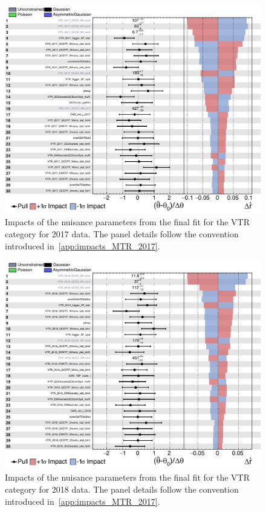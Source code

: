 \begin{figure}[htbp]
  \centering
   \includegraphics[width=\textwidth]{FIt_structure/impacts_perchannel_VTR_2017_p1.pdf}
   
  \caption{Impacts of the nuisance parameters from the final fit for the VTR category for 2017 data. The panel details follow the convention introduced in~\ref{app:impacts_MTR_2017}.}
  \label{app:impacts_VTR_2017}
\end{figure}

\begin{figure}[htbp]
  \centering
   \includegraphics[width=\textwidth]{FIt_structure/impacts_perchannel_VTR_2018_p1.pdf}
   
  \caption{Impacts of the nuisance parameters from the final fit for the VTR category for 2018 data. The panel details follow the convention introduced in~\ref{app:impacts_MTR_2017}.}
  \label{app:impacts_VTR_2018}
\end{figure}





